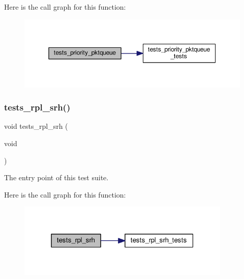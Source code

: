 Here is the call graph for this function\+:
\nopagebreak
\begin{figure}[H]
\begin{center}
\leavevmode
\includegraphics[width=350pt]{group__unittests_gab6133c9a0e70affe6b5a5267478e6d9d_cgraph}
\end{center}
\end{figure}
\mbox{\label{group__unittests_ga48f41dab63963836bd0a692d9137d0a8}} 
\subsubsection{\texorpdfstring{tests\+\_\+rpl\+\_\+srh()}{tests\_rpl\_srh()}}
{\footnotesize\ttfamily void tests\+\_\+rpl\+\_\+srh (\begin{DoxyParamCaption}\item[{void}]{ }\end{DoxyParamCaption})}



The entry point of this test suite. 

Here is the call graph for this function\+:
\nopagebreak
\begin{figure}[H]
\begin{center}
\leavevmode
\includegraphics[width=289pt]{group__unittests_ga48f41dab63963836bd0a692d9137d0a8_cgraph}
\end{center}
\end{figure}
\mbox{\label{group__unittests_gaeae46a0be227b9113311165fc3b3752b}} 
